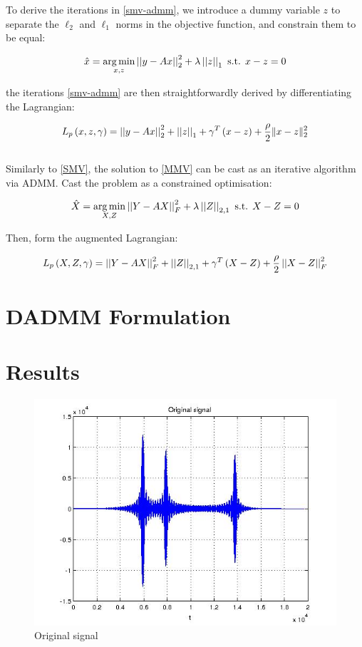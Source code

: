 \documentclass{article}
\begin{document}
To derive the iterations in \eqref{smv-admm}, we introduce a dummy variable \(z\) to separate the \(\ell_2\) and \(\ell_1\) norms in the objective function, and constrain them to be equal:

\begin{equation}
\hat{x} = \operatorname*{arg\,min}_{x,z} \left|\left|y - Ax\right|\right|_2^2 + \lambda\left|\left|z\right|\right|_1 \text{ s.t. } x - z = 0
\label{smv-cons-opt}
\end{equation}

the iterations \eqref{smv-admm} are then straightforwardly derived by differentiating the Lagrangian:

\begin{equation}
L_p\left(x, z, \gamma\right) = \left|\left|y - Ax\right|\right|_2^2 + \left|\left|z\right|\right|_1 + \gamma^T\left(x-z\right) + \frac{\rho}{2}\|x-z\|_2^2
\label{smv-lagrangian}
\end{equation}
\\
Similarly to \eqref{SMV}, the solution to \eqref{MMV} can be cast as an iterative algorithm via ADMM. Cast the problem as a constrained optimisation:

\begin{equation}
\hat{X} = \operatorname*{arg\,min}_{X,Z} \left|\left|Y - AX\right|\right|_F^2 + \lambda\left|\left|Z\right|\right|_{2,1} \text{ s.t. } X - Z = 0
\label{mmv-cons-opt}
\end{equation}

Then, form the augmented Lagrangian:

\begin{equation}
L_p\left(X, Z, \gamma\right) = \left|\left|Y - AX\right|\right|_F^2 + \left|\left|Z\right|\right|_{2,1} + \gamma^T\left(X-Z\right) + \frac{\rho}{2}\left|\left|X-Z\right|\right|_F^2
\label{mmv-lagrangian}
\end{equation}

\section{DADMM Formulation}

\section{Results}

\begin{figure}[h]
\centering
\includegraphics[height = 7.3 cm]{orig.jpg}
\caption{Original signal}
\label{orig_sigs}
\end{figure}
\end{document}
